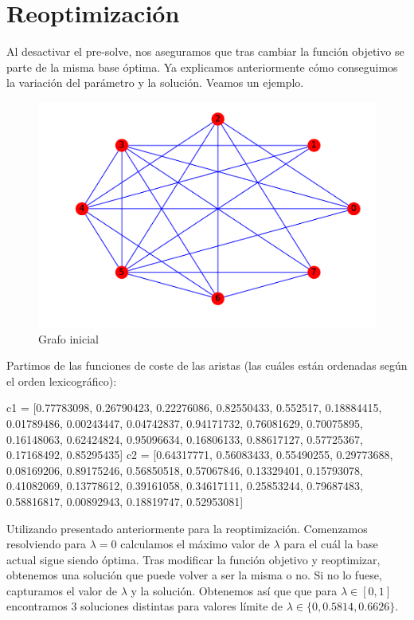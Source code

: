 \documentclass[twoside,a4paper,openright,12pt,tikz]{book}
\begin{document}
\section{Reoptimización}
Al desactivar el pre-solve, nos aseguramos que tras cambiar la función objetivo se parte de la misma base óptima. Ya explicamos anteriormente cómo conseguimos la variación del parámetro y la solución. Veamos un ejemplo.
\begin{figure}[h!]
\centering
\includegraphics[scale=0.5]{opt}
\caption{Grafo inicial}
\end{figure}

Partimos de las funciones de coste de las aristas (las cuáles están ordenadas según el orden lexicográfico):
\begin{pythone}
c1 = [0.77783098, 0.26790423, 0.22276086, 0.82550433, 0.552517, 0.18884415, 0.01789486, 0.00243447, 0.04742837, 0.94171732, 0.76081629, 0.70075895, 0.16148063, 0.62424824, 0.95096634, 0.16806133, 0.88617127, 0.57725367, 0.17168492, 0.85295435]
c2 = [0.64317771, 0.56083433, 0.55490255, 0.29773688, 0.08169206, 0.89175246, 0.56850518, 0.57067846, 0.13329401, 0.15793078, 0.41082069, 0.13778612, 0.39161058, 0.34617111, 0.25853244, 0.79687483, 0.58816817, 0.00892943, 0.18819747, 0.52953081]
\end{pythone}
Utilizando presentado anteriormente para la reoptimización. Comenzamos resolviendo para $\lambda=0$ calculamos el máximo valor de $\lambda$ para el cuál la base actual sigue siendo óptima. Tras modificar la función objetivo y reoptimizar, obtenemos una solución que puede volver a ser la misma o no. Si no lo fuese, capturamos el valor de $\lambda$ y la solución. Obtenemos así que que para $\lambda\in [0,1]$ encontramos 3 soluciones distintas para valores límite de $\lambda \in \{0,0.5814,0.6626\}$.
\end{document}
